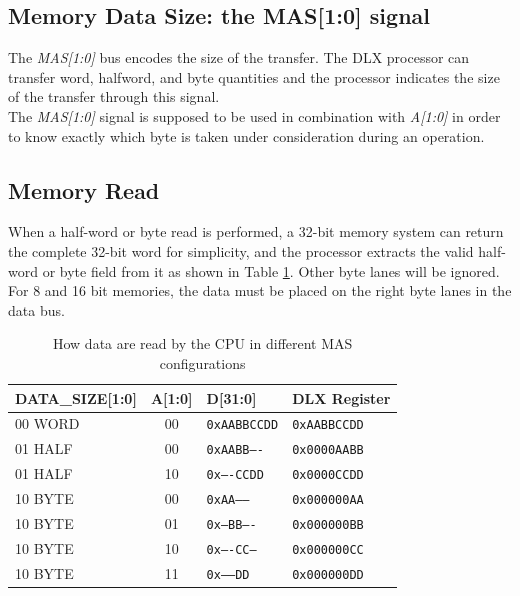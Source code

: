 \subsection{Memory Data Size: the MAS[1:0] signal}
\label{mas}

The \emph{MAS[1:0]} bus encodes the size of the transfer. The DLX processor can transfer word, halfword, and byte quantities and the processor indicates the size of the transfer through this signal.\\

The \emph{MAS[1:0]} signal is supposed to be used in combination with \emph{A[1:0]} in order to know exactly which byte is taken under consideration during an operation.

\subsection{Memory Read}

When a half-word or byte read is performed, a 32-bit memory system can return the complete 32-bit word for simplicity, and the processor extracts the valid half-word or byte field from it as shown in Table \ref{table:memory_read_configuration}. Other byte lanes will be ignored. For 8 and 16 bit memories, the data must be placed on the right byte lanes in the data bus.

\begin{table}[H]
    \centering
    \begin{tabular}{|l|c|l|l|}
    \hline
        DATA\_SIZE[1:0] & A[1:0] & D[31:0] & DLX Register \\ \hline
        00 WORD & 00 & \texttt{0xAABBCCDD} & \texttt{0xAABBCCDD} \\ \hline
        01 HALF & 00 & \texttt{0xAABB----} & \texttt{0x0000AABB} \\ \hline
        01 HALF & 10 & \texttt{0x----CCDD} & \texttt{0x0000CCDD} \\ \hline
        10 BYTE & 00 & \texttt{0xAA------} & \texttt{0x000000AA} \\ \hline
        10 BYTE & 01 & \texttt{0x--BB----} & \texttt{0x000000BB} \\ \hline
        10 BYTE & 10 & \texttt{0x----CC--} & \texttt{0x000000CC} \\ \hline
        10 BYTE & 11 & \texttt{0x------DD} & \texttt{0x000000DD} \\ \hline
    \end{tabular}
    \caption{How data are read by the CPU in different MAS configurations}
    \label{table:memory_read_configuration}
\end{table}

